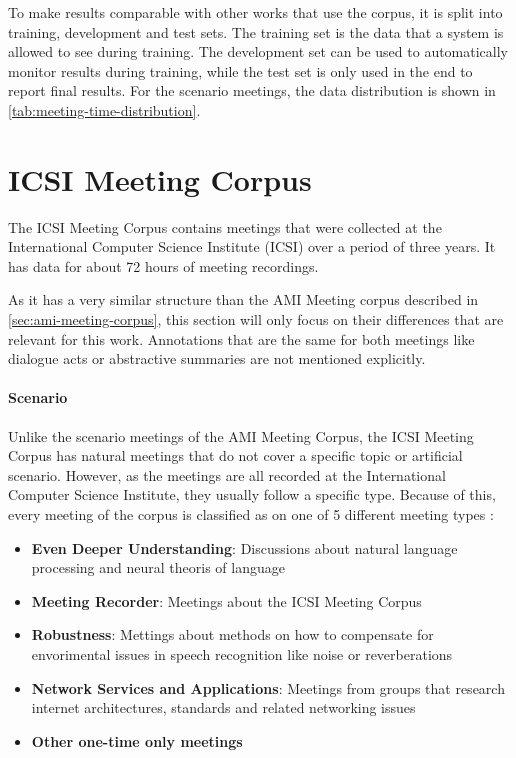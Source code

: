 To make results comparable with other works that use the corpus, it is split into training, development and test sets.
The training set is the data that a system is allowed to see during training.
The development set can be used to automatically monitor results during training, while the test set is only used in the end to report final results.
For the scenario meetings, the data distribution is shown in \cref{tab:meeting-time-distribution}. \cite{amiWebsite}


\section{ICSI Meeting Corpus}\label{sec:icsi-corpus}

The ICSI Meeting Corpus contains meetings that were collected at the International Computer Science Institute (ICSI) over a period of three years.
It has data for about 72 hours of meeting recordings. \cite{Janin}

As it has a very similar structure than the AMI Meeting corpus described in \cref{sec:ami-meeting-corpus}, this section will only focus on their differences that are relevant for this work.
Annotations that are the same for both meetings like dialogue acts or abstractive summaries are not mentioned explicitly.

\paragraph{Scenario}

Unlike the scenario meetings of the AMI Meeting Corpus, the ICSI Meeting Corpus has natural meetings that do not cover a specific topic or artificial scenario.
However, as the meetings are all recorded at the International Computer Science Institute, they usually follow a specific type.
Because of this, every meeting of the corpus is classified as on one of 5 different meeting types \cite{Janin}:
\begin{itemize}
\item \textbf{Even Deeper Understanding}: Discussions about natural language processing and neural theoris of language
\item \textbf{Meeting Recorder}: Meetings about the ICSI Meeting Corpus
\item \textbf{Robustness}: Mettings about methods on how to compensate for envorimental issues in speech recognition like noise or reverberations
\item \textbf{Network Services and Applications}: Meetings from groups that research internet architectures, standards and related networking issues
\item \textbf{Other one-time only meetings}
\end{itemize}

